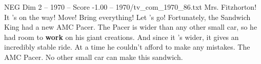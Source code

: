 \begin{textsample}{NEG Dim 2 – 1970 – Score -1.00 – 1970/tv\_com\_1970\_86.txt}  \label{ex:f2_neg_049}
Mrs.
Fitzhorton!
It 's on the way!
Move!
Bring everything!
Let 's go!
Fortunately, the Sandwich King had a new AMC Pacer.
The Pacer is wider than any other small car, so he had room to \textbf{work} on his giant creations.
And since it 's wider, it gives an incredibly stable ride.
At a time he couldn't afford to make any mistakes.
The AMC Pacer.
No other small car can make this sandwich.

\end{textsample}

